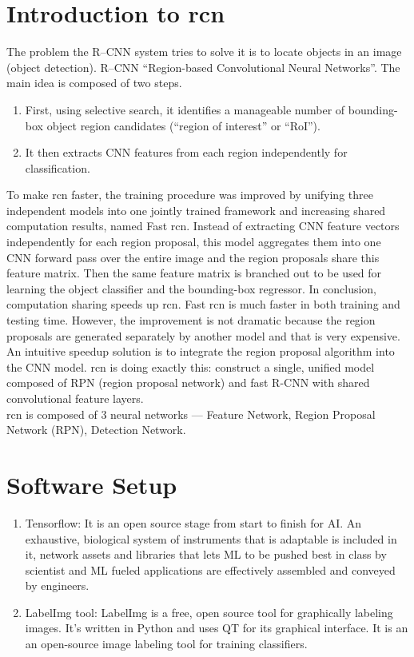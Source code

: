 \section{Introduction to \acrlong{rcn}}
The problem the R--CNN system tries to solve it is to locate objects in an image (object detection). R--CNN “Region-based Convolutional Neural Networks”. The main idea is composed of two steps. 
\begin{enumerate}
    \item First, using selective search, it identifies a manageable number of bounding-box object region candidates (“region of interest” or “RoI”). 
    \item It then extracts CNN features from each region independently for classification.
\end{enumerate}
To make \acrshort{rcn} faster, the training procedure was improved by unifying three independent models into one jointly trained framework and increasing shared computation results, named Fast \acrshort{rcn}. Instead of extracting CNN feature vectors independently for each region proposal, this model aggregates them into one CNN forward pass over the entire image and the region proposals share this feature matrix. Then the same feature matrix is branched out to be used for learning the object classifier and the bounding-box regressor. In conclusion, computation sharing speeds up \acrshort{rcn}. Fast \acrshort{rcn} is much faster in both training and testing time. However, the improvement is not dramatic because the region proposals are generated separately by another model and that is very expensive.\\
An intuitive speedup solution is to integrate the region proposal algorithm into the CNN model. \acrlong{rcn} \cite{wang2017scene} is doing exactly this: construct a single, unified model composed of RPN (region proposal network) and fast R-CNN with shared convolutional feature layers.\\
\acrfull{rcn} is composed of 3 neural networks — Feature Network, Region Proposal Network (RPN), Detection Network.

\section{Software Setup}
\begin{enumerate}
\item Tensorflow: It is an open source stage from start to finish for AI. An exhaustive, biological system of instruments that is adaptable is included in it, network assets and libraries that lets ML to be pushed best in class by scientist and ML fueled applications are effectively assembled and conveyed by engineers.
\item LabelImg tool: LabelImg is a free, open source tool for graphically labeling images. It's written in Python and uses QT for its graphical interface. It is an 
an open-source image labeling tool for training classifiers.
\end{enumerate}

